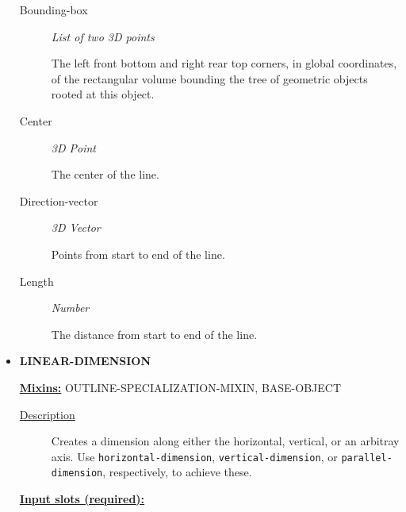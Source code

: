 \documentclass [11pt]{book}
\begin{document}
\begin{itemize}
\begin{description}
\item [Bounding-box]
\emph{List of two 3D points}

 The left front bottom and right rear top corners, in global coordinates,
of the rectangular volume bounding the tree of geometric objects rooted at this object.




\item [Center]
\emph{3D Point}

 The center of the line.




\item [Direction-vector]
\emph{3D Vector}

 Points from start to end of the line.




\item [Length]
\emph{Number}

 The distance from start to end of the line.




\end{description}







\item {}
\textbf{LINEAR-DIMENSION}


\textbf{
\underline{Mixins:}} OUTLINE-SPECIALIZATION-MIXIN, BASE-OBJECT





\begin{description}

\item [
\underline{Description}]


Creates a dimension along either the horizontal, vertical, or an arbitray axis. Use
\texttt{horizontal-dimension}, \texttt{vertical-dimension}, or \texttt{parallel-dimension}, respectively, to achieve these.



\end{description}








\textbf{
\underline{Input slots (required):}}

\begin{description}


\end{description}
\end{itemize}
\end{document}
